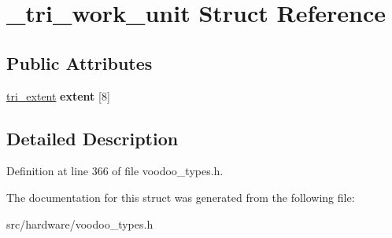 \hypertarget{struct__tri__work__unit}{\section{\-\_\-tri\-\_\-work\-\_\-unit Struct Reference}
\label{struct__tri__work__unit}
}
\subsection*{Public Attributes}
\begin{DoxyCompactItemize}
\item 
\hypertarget{struct__tri__work__unit_a2f9d80656d7b28f082c345d5a6f5a299}{\hyperlink{struct__tri__extent}{tri\-\_\-extent} {\bfseries extent} \mbox{[}8\mbox{]}}\label{struct__tri__work__unit_a2f9d80656d7b28f082c345d5a6f5a299}

\end{DoxyCompactItemize}


\subsection{Detailed Description}


Definition at line 366 of file voodoo\-\_\-types.\-h.



The documentation for this struct was generated from the following file\-:\begin{DoxyCompactItemize}
\item 
src/hardware/voodoo\-\_\-types.\-h\end{DoxyCompactItemize}
